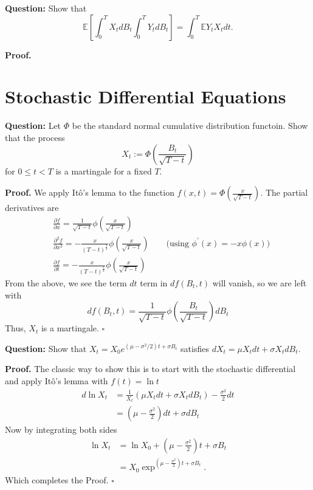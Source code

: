\documentclass{article}
\begin{document}
\begin{tcolorbox}[colframe=black,colback=gray!5,boxrule=0.5pt]
\textbf{Question:} Show that 
$$\mathbb{E}\left[\int_0^TX_tdB_t\int_0^TY_tdB_t\right] = \int_0^T\mathbb{E}Y_tX_tdt.$$
\end{tcolorbox}
\textbf{Proof.}


\newpage
\section{Stochastic Differential Equations}

\begin{tcolorbox}[colframe=black,colback=gray!5,boxrule=0.5pt]
\textbf{Question:} Let $\Phi$ be the standard normal cumulative distribution functoin. Show that the process $$X_t := \Phi\left(\frac{B_t}{\sqrt{T-t}}\right)$$ for $0\leq t<T$ is a martingale for a fixed $T$.
\end{tcolorbox}
\textbf{Proof.} We apply Itô's lemma to the function $f(x,t) = \Phi(\frac{x}{\sqrt{T-t}})$. The partial derivatives are 
\begin{align*}
    & \frac{\partial f}{\partial x} = \frac{1}{\sqrt{T-t}} \phi\left(\frac{x}{\sqrt{T-t}}\right) \\
    & \frac{\partial^2 f}{\partial x^2} = - \frac{x}{(T-t)^{\frac{3}{2}}} \phi\left(\frac{x}{\sqrt{T-t}}\right) \quad\quad \text{(using $\phi^\prime(x) = -x\phi(x)$)} \\
    & \frac{\partial f}{\partial t} = -\frac{x}{(T-t)^{\frac{3}{2}}}\phi\left(\frac{x}{\sqrt{T-t}}\right)
\end{align*}
From the above, we see the term $dt$ term in $df(B_t,t)$ will vanish, so we are left with 
$$df(B_t,t) = \frac{1}{\sqrt{T-t}} \phi\left(\frac{B_t}{\sqrt{T-t}}\right)dB_t$$
Thus, $X_t$ is a martingale. $\square$




\begin{tcolorbox}[colframe=black,colback=gray!5,boxrule=0.5pt]
\textbf{Question:} Show that $X_t = X_0 e^{(\mu-\sigma^2/2)t + \sigma B_t}$ satisfies $dX_t =\mu X_t dt + \sigma X_t dB_t$.
\end{tcolorbox}
\textbf{Proof.} The classic way to show this is to start with the stochastic differential and apply Itô's lemma with $f(t) = \ln t$
\begin{align*}
    d\ln X_t  &= \frac{1}{X_t}(\mu X_t dt + \sigma X_t dB_t) - \frac{\sigma^2}{2}dt \\
              &= \left(\mu - \frac{\sigma^2}{2}\right)dt + \sigma dB_t
\end{align*}
Now by integrating both sides
\begin{align*}
    \ln X_t &= \ln X_0 + \left(\mu - \frac{\sigma^2}{2}\right)t + \sigma B_t \\
    &= X_0 \exp^{\left(\mu - \frac{\sigma^2}{2}\right)t + \sigma B_t}.
\end{align*}
Which completes the Proof. $\square$
\end{document}
